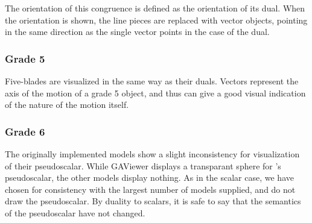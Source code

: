The orientation of this congruence is defined as the orientation of its dual.  When the orientation is shown, the line pieces are replaced with vector objects, pointing in the same direction as the single vector points in the case of the dual.

\subsubsection{Grade 5}
Five-blades are visualized in the same way as their duals.  Vectors represent the axis of the motion of a grade 5 object, and thus can give a good visual indication of the nature of the motion itself.

\subsubsection{Grade 6}
The originally implemented models show a slight inconsistency for visualization of their pseudoscalar.  While GAViewer displays a transparant sphere for \ega{}'s pseudoscalar, the other models display nothing.  As in the scalar case, we have chosen for consistency with the largest number of models supplied, and do not draw the pseudoscalar.  By duality to scalars, it is safe to say that the semantics of the pseudoscalar have not changed.
